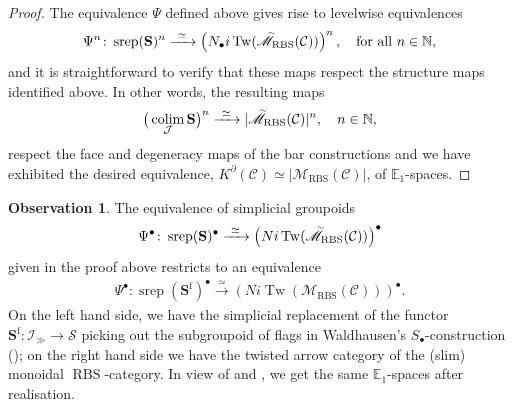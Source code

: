 \documentclass[12pt, reqno]{amsart}
\theoremstyle{plain}
\theoremstyle{definition}
\newtheorem{observation}[theorem]{Observation}
\newcommand{\N}{\mathbb N}
\begin{document}
\begin{proof}
The equivalence $\Psi$ defined above gives rise to levelwise equivalences
\begin{align*}
\Psi^n\colon \operatorname{srep}(\mathbf{S})^n\xrightarrow{\ \simeq\ } \left(N_\bullet i\operatorname{Tw}(\accentset{\sim}{\mathscr{M}}_{\operatorname{RBS}}(\mathcal{C}))\right)^n,\quad \text{for all }n\in \N,
\end{align*}
and it is straightforward to verify that these maps respect the structure maps identified above. In other words, the resulting maps
\begin{align*}
\big(\mathop{\operatorname{colim}}_{\mathcal{J}}\mathbf{S}\big)^n \xrightarrow{\ \simeq\ } |\accentset{\sim}{\mathscr{M}}_{\operatorname{RBS}}(\mathcal{C})|^n,\quad n\in \N,
\end{align*}
respect the face and degeneracy maps of the bar constructions and we have exhibited the desired equivalence, $K^\partial(\mathcal{C})\simeq |\mathscr{M}_{\operatorname{RBS}}(\mathcal{C})|$, of $\mathbb{E}_1$-spaces.
\end{proof}

\begin{observation}\label{restricting to flags}
The equivalence of simplicial groupoids
\begin{align*}
\Psi^\bullet\colon \operatorname{srep}(\mathbf{S})^\bullet\xrightarrow{\ \simeq\ } \left(N i\operatorname{Tw}(\accentset{\sim}{\mathscr{M}}_{\operatorname{RBS}}(\mathcal{C}))\right)^\bullet
\end{align*}
given in the proof above restricts to an equivalence
\begin{align*}
\Psi^\bullet\colon \operatorname{srep}(\mathbf{S}^{\operatorname{f}})^\bullet\xrightarrow{\ \simeq\ } \left(N i\operatorname{Tw}(\mathscr{M}_{\operatorname{RBS}}(\mathcal{C}))\right)^\bullet.
\end{align*}
On the left hand side, we have the simplicial replacement of the functor $\mathbf{S}^{\operatorname{f}}\colon \mathcal{I}_\gg\rightarrow \mathcal{S}$ picking out the subgroupoid of flags in Waldhausen's $S_\bullet$-construction (); on the right hand side we have the twisted arrow category of the (slim) monoidal $\operatorname{RBS}$-category. In view of  and , we get the same $\mathbb{E}_1$-spaces after realisation.
\end{observation}
\end{document}
